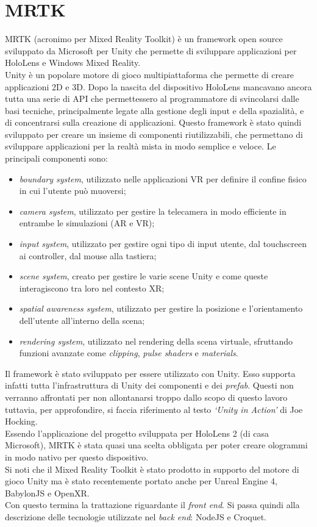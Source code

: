 \section{MRTK}\label{sec:MRTK}
MRTK (acronimo per Mixed Reality Toolkit) è un framework open source sviluppato da Microsoft per Unity che permette di sviluppare applicazioni per HoloLens e Windows Mixed Reality\cite{MRTK}.\\
Unity è un popolare motore di gioco multipiattaforma che permette di creare applicazioni 2D e 3D.
Dopo la nascita del dispositivo HoloLens mancavano ancora tutta una serie di API che permettessero al programmatore di svincolarsi dalle basi tecniche, principalmente legate 
alla gestione degli input e della spazialità, e di concentrarsi sulla creazione di applicazioni.
Questo framework è stato quindi sviluppato per creare un insieme di componenti riutilizzabili, che permettano di sviluppare applicazioni per la realtà mista in modo semplice e 
veloce. Le principali componenti sono:
\begin{itemize}
    \item \textit{boundary system}, utilizzato nelle applicazioni VR per definire il confine fisico in cui l'utente può muoversi;
    \item \textit{camera system}, utilizzato per gestire la telecamera in modo efficiente in entrambe le simulazioni (AR e VR);
    \item \textit{input system}, utilizzato per gestire ogni tipo di input utente, dal touchscreen ai controller, dal mouse alla tastiera;
    \item \textit{scene system}, creato per gestire le varie scene Unity e come queste interagiscono tra loro nel contesto XR;
    \item \textit{spatial awareness system}, utilizzato per gestire la posizione e l'orientamento dell'utente all'interno della scena;
    \item \textit{rendering system}, utilizzato nel rendering della scena virtuale, sfruttando funzioni avanzate come \textit{clipping}, \textit{pulse shaders} e \textit{materials}.
\end{itemize}
Il framework è stato sviluppato per essere utilizzato con Unity. Esso supporta infatti tutta l'infrastruttura di Unity dei componenti e dei \textit{prefab}. Questi
non verranno affrontati per non allontanarsi troppo dallo scopo di questo lavoro tuttavia, per approfondire, si faccia riferimento al testo \textit{`Unity in Action'} di Joe 
Hocking\cite{hocking2018}. \\
Essendo l'applicazione del progetto sviluppata per HoloLens 2 (di casa Microsoft), MRTK è stata quasi una scelta obbligata per poter creare ologrammi in modo nativo per questo dispositivo.\\
Si noti che il Mixed Reality Toolkit è stato prodotto in supporto del motore di gioco Unity ma è stato recentemente portato anche per Unreal Engine 4, BabylonJS e OpenXR.\\
\newline
Con questo termina la trattazione riguardante il \textit{front end}. Si passa quindi alla descrizione delle tecnologie utilizzate nel \textit{back end}: NodeJS e Croquet.

